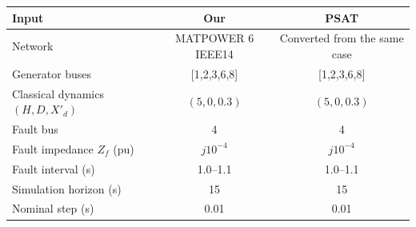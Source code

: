 \begin{tabular}{lcc}\toprule
Input & Our & PSAT \\ \midrule
Network & MATPOWER 6 IEEE14 & Converted from the same case \\
Generator buses & {[1,2,3,6,8]} & {[1,2,3,6,8]} \\
Classical dynamics $(H,D,X'_d)$ & $(5,0,0.3)$ & $(5,0,0.3)$ \\
Fault bus & 4 & 4 \\
Fault impedance $Z_f$ (pu) & {$j10^{-4}$} & {$j10^{-4}$} \\
Fault interval (s) & 1.0--1.1 & 1.0--1.1 \\
Simulation horizon (s) & 15 & 15 \\
Nominal step (s) & 0.01 & 0.01 \\
\bottomrule\end{tabular}
